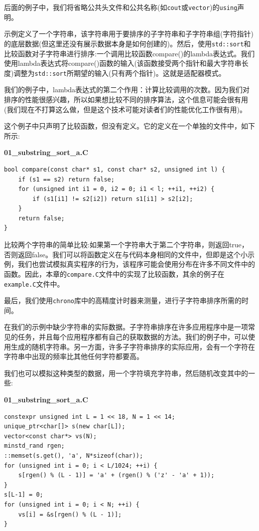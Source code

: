 后面的例子中，我们将省略公共头文件和公共名称(如\texttt{cout}或\texttt{vector})的\texttt{using}声明。

示例定义了一个字符串，该字符串用于要排序的子字符串和子字符串组(字符指针)的底层数据(但这里还没有展示数据本身是如何创建的)。然后，使用\texttt{std::sort}和比较函数对子字符串进行排序:一个调用比较函数compare()的lambda表达式。我们使用lambda表达式将compare()函数的输入(该函数接受两个指针和最大字符串长度)调整为\texttt{std::sort}所期望的输入(只有两个指针)。这就是适配器模式。

我们的例子中，lambda表达式的第二个作用：计算比较调用的次数。因为我们对排序的性能很感兴趣，所以如果想比较不同的排序算法，这个信息可能会很有用(我们现在不打算这么做，但是这个技术可能对读者们的性能优化工作很有用)。

这个例子中只声明了比较函数，但没有定义。它的定义在一个单独的文件中，如下所示:


\noindent
\textbf{01\_substring\_sort\_a.C}
\begin{lstlisting}[style=styleCXX]
bool compare(const char* s1, const char* s2, unsigned int l) {
	if (s1 == s2) return false;
	for (unsigned int i1 = 0, i2 = 0; i1 < l; ++i1, ++i2) {
		if (s1[i1] != s2[i2]) return s1[i1] > s2[i2];
	}
	return false;
}
\end{lstlisting}

比较两个字符串的简单比较:如果第一个字符串大于第二个字符串，则返回true，否则返回false。我们可以将函数定义在与代码本身相同的文件中，但即是这个小示例，我们也尝试模拟真实程序的行为，该程序可能会使用分布在许多不同文件中的函数。因此，本章的\texttt{compare.C}文件中的实现了比较函数，其余的例子在\texttt{example.C}文件中。

最后，我们使用\texttt{chrono}库中的高精度计时器来测量，进行子字符串排序所需的时间。

在我们的示例中缺少字符串的实际数据。子字符串排序在许多应用程序中是一项常见的任务，并且每个应用程序都有自己的获取数据的方法。我们的例子中，可以使用生成的随机字符串。另一方面，许多子字符串排序的实际应用，会有一个字符在字符串中出现的频率比其他任何字符都要高。

我们也可以模拟这种类型的数据，用一个字符填充字符串，然后随机改变其中的一些:

\noindent
\textbf{01\_substring\_sort\_a.C}
\begin{lstlisting}[style=styleCXX]
constexpr unsigned int L = 1 << 18, N = 1 << 14;
unique_ptr<char[]> s(new char[L]);
vector<const char*> vs(N);
minstd_rand rgen;
::memset(s.get(), 'a', N*sizeof(char));
for (unsigned int i = 0; i < L/1024; ++i) {
	s[rgen() % (L - 1)] = 'a' + (rgen() % ('z' - 'a' + 1));
}
s[L-1] = 0;
for (unsigned int i = 0; i < N; ++i) {
	vs[i] = &s[rgen() % (L - 1)];
}
\end{lstlisting}

